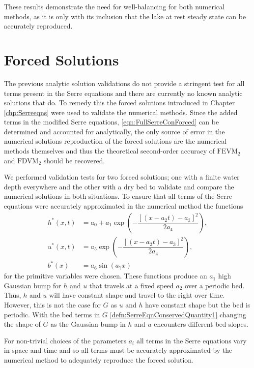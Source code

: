 These results demonstrate the need for well-balancing for both numerical methods, as it is only with its inclusion that the lake at rest steady state can be accurately reproduced. 


\section{Forced Solutions}
The previous analytic solution validations do not provide a stringent test for all terms present in the Serre equations and there are currently no known analytic solutions that do. To remedy this the forced solutions introduced in Chapter \ref{chp:Serreeqns} were used to validate the numerical methods. Since the added terms in the modified Serre equations, \eqref{eqn:FullSerreConForced} can be determined and accounted for analytically, the only source of error in the numerical solutions reproduction of the forced solutions are the numerical methods themselves and thus the theoretical second-order accuracy of $\text{FEVM}_2$ and $\text{FDVM}_2$ should be recovered. 

We performed validation tests for two forced solutions; one with a finite water depth everywhere and the other with a dry bed to validate and compare the numerical solutions in both situations. To ensure that all terms of the Serre equations were accurately approximated in the numerical method the functions
\begin{subequations}
\begin{align}
\label{eqn:ForcedSolutionxt}
h^*(x,t) &= a_0 + a_1 \exp\left(-\dfrac{\left[\left(x - a_2 t\right) - a_3\right]^2}{2 a_4}\right), \\
u^*(x,t) &= a_5 \exp\left(-\dfrac{\left[\left(x - a_2 t\right) - a_3\right]^2}{2 a_4}\right), \\
b^*(x) &= a_6 \sin\left(a_7 x\right)
\end{align}
\end{subequations}
for the primitive variables were chosen. These functions produce an $a_1$ high Gaussian bump for $h$ and $u$ that travels at a fixed speed $a_2$ over a periodic bed. Thus, $h$ and $u$ will have constant shape and travel to the right over time. However, this is not the case for $G$ as $u$ and $h$ have constant shape but the bed is periodic. With the bed terms in $G$ \eqref{defn:SerreEqnConservedQuantity1} changing the shape of $G$ as the Gaussian bump in $h$ and $u$ encounters different bed slopes.

For non-trivial choices of the parameters $a_i$ all terms in the Serre equations vary in space and time and so all terms must be accurately approximated by the numerical method to adequately reproduce the forced solution. 


